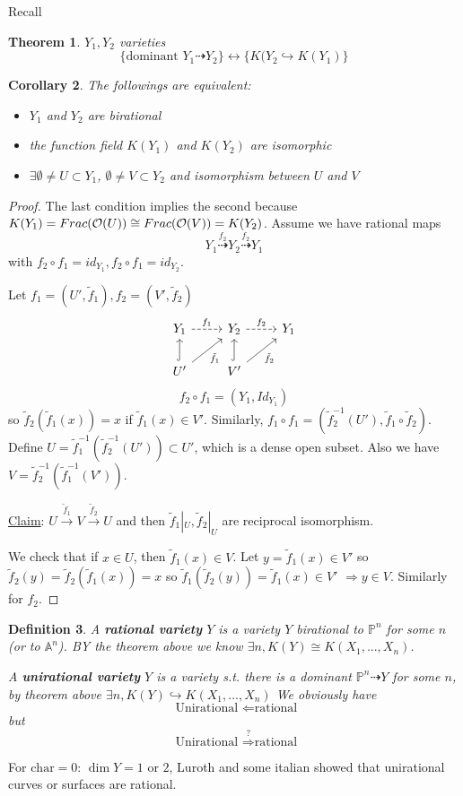 \documentclass[11pt]{article}
\newtheorem{thm}{Theorem}[section]
\newtheorem{cor}[thm]{Corollary}
\newtheorem{dfn}[thm]{Definition}
\newcommand{\affn}{\mathbb A}
\newcommand{\proj}{\mathbb P}
\newcommand{\calo}{{\cal O}}
\newcommand{\drta}{\dashrightarrow}
\newcommand{\Lrta}{\Longrightarrow}
\newcommand{\lrta}{\longrightarrow}
\newcommand{\llrta}{\longleftrightarrow}
\newcommand{\Llta}{\Longleftarrow}
\newcommand{\inj}{\hookrightarrow}
\begin{document}
Recall
\begin{thm} $Y_1,Y_2$ varieties
$$\{ \text{dominant }Y_1\dashrightarrow Y_2\}\llrta\{K(Y_2\inj K(Y_1)\}$$
\end{thm}
\begin{cor}The followings are equivalent:
\begin{itemize}
	\item
$Y_1$  and $Y_2$ are birational \item the function field $K(Y_1)$ and $K(Y_2)$ are isomorphic
\item $\exists \emptyset \neq U\subset Y_1$, $\emptyset \neq V\subset Y_2$ and isomorphism between $U$ and $V$
\end{itemize}
\end{cor}
\begin{proof}
The last condition implies the second because $K(Y_1)=Frac(\calo(U))\cong Frac(\calo(V))=K(Y_2)$. Assume we have rational maps 
$$
Y_1\overset{f_2}{\drta}Y_2\overset{f_2}{\drta} Y_1
$$
with $f_2\circ f_1=id_{Y_1}, f_2\circ f_1= id_{Y_2}$. 

Let $f_1=(U',\tilde{f}_1), f_2=(V',\tilde{f}_2)$
\[
\begin{tikzcd}
Y_1 \arrow[r, dashed,"f_1"] & Y_2 \arrow[r, dashed,"f_2"] & Y_1 \\
U' \arrow[ru, "\tilde{f}_1"'] \arrow[u,hook] & V' \arrow[ru, "\tilde{f}_2"'] \arrow[u, hook] & 
\end{tikzcd}
\]
$$
f_2\circ f_1=(Y_1,Id_{Y_1})
$$
so $\tilde{f}_2(\tilde{f}_1(x))=x$ if $\tilde{f}_1(x)\in V'$.
Similarly, $f_1\circ f_1=(\tilde{f}_2^{-1}(U'),\tilde{f}_1\circ \tilde{f}_2)$. Define $U=\tilde{f}^{-1}_{1}(\tilde{f}_{2}^{-1}(U'))\subset U'$, which is a dense open subset. Also we have $V=\tilde{f}^{-1}_{2}(\tilde{f}_{1}^{-1}(V'))$.

\underline{Claim}: $U\overset{\tilde{f}_1}{\lrta }V\overset{\tilde{f}_2}{\lrta} U$ and then $\tilde{f}_1|_U,\tilde{f}_2|_U$ are reciprocal isomorphism.

We check that if $x\in  U$, then $\tilde{f}_1(x)\in V$.
Let $y=\tilde{f}_1(x)\in V'$ so $\tilde{f}_2(y)=\tilde{f}_2(\tilde{f}_1(x))=x$ so $\tilde{f}_1(\tilde{f}_2(y))=\tilde{f}_1(x)\in V'$ $\Lrta y\in V$. Similarly for $f_2$.
\end{proof}

\begin{dfn}
A \textbf{rational variety} $Y$ is a variety $Y$ birational to $\proj^n$ for some $n$ (or to $\affn^n$). BY the theorem above we know $\exists n, K(Y)\cong K(X_1,...,X_n)$. 

A \textbf{unirational variety} $Y$ is a variety s.t. there is a dominant $\proj^n\drta Y$ for some $n$, by theorem above $\exists n, K(Y)\inj K(X_1,...,X_n)$
We obviously have
$$
\text{ Unirational } \Llta \text{rational}
$$
but 
$$
\text{ Unirational } \overset{?}{\Lrta} \text{rational}
$$
\end{dfn}
For $\text{char}= 0$: $\dim Y=1$ or $2$, Luroth and some italian showed that unirational curves or surfaces are rational.
\end{document}
